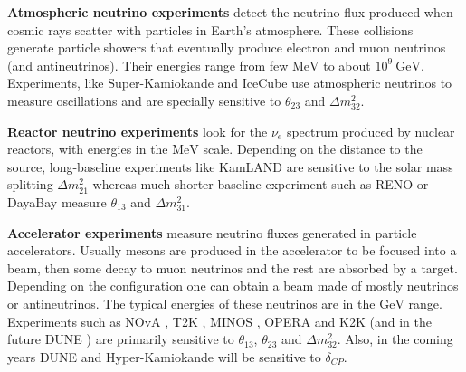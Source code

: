 \textbf{Atmospheric neutrino experiments} detect the neutrino flux produced when cosmic rays scatter with particles in Earth's atmosphere. These collisions generate particle showers that eventually produce electron and muon neutrinos (and antineutrinos). Their energies range from few $\mathrm{MeV}$ to about $10^{9} \ \mathrm{GeV}$. Experiments, like Super-Kamiokande \cite{Super-Kamiokande2017} and IceCube \cite{IceCube2017} use atmospheric neutrinos to measure oscillations and are specially sensitive to $\theta_{23}$ and $\Delta m^{2}_{32}$.

\textbf{Reactor neutrino experiments} look for the $\bar{\nu}_{e}$ spectrum produced by nuclear reactors, with energies in the $\mathrm{MeV}$ scale. Depending on the distance to the source, long-baseline experiments like KamLAND \cite{KamLAND2013} are sensitive to the solar mass splitting $\Delta m^{2}_{21}$ whereas much shorter baseline experiment such as RENO \cite{RENO2018} or DayaBay \cite{DayaBay2018} measure $\theta_{13}$ and $\Delta m^{2}_{31}$.

\textbf{Accelerator experiments} measure neutrino fluxes generated in particle accelerators. Usually mesons are produced in the accelerator to be focused into a beam, then some decay to muon neutrinos and the rest are absorbed by a target. Depending on the configuration one can obtain a beam made of mostly neutrinos or antineutrinos. The typical energies of these neutrinos are in the $\mathrm{GeV}$ range. Experiments such as NOvA \cite{Nova2020}, T2K \cite{T2K2020}, MINOS \cite{MINOS2014}, OPERA \cite{OPERA2018} and K2K \cite{K2K2006} (and in the future DUNE \cite{DUNE2020}) are primarily sensitive to $\theta_{13}$, $\theta_{23}$ and $\Delta m^{2}_{32}$. Also, in the coming years  DUNE \cite{DUNE2020} and Hyper-Kamiokande \cite{Hyper-Kamiokande2019} will be sensitive to $\delta_{CP}$.

